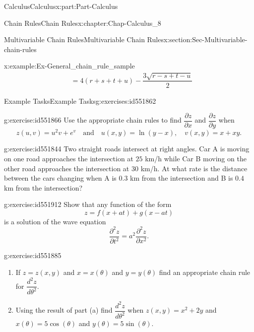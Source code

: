 \documentclass[oneside,10pt,]{book}
\numberwithin{equation}{section}
\newcommand{\amp}{&}
\begin{document}
\begin{partptx}{Calculus}{}{Calculus}{}{}{x:part:Part-Calculus}
\begin{chapterptx}{Chain Rules}{}{Chain Rules}{}{}{x:chapter:Chap-Calculus_8}
\begin{sectionptx}{Multivariable Chain Rules}{}{Multivariable Chain Rules}{}{}{x:section:Sec-Multivariable-chain-rules}
\begin{example}{}{x:example:Ex-General_chain_rule_sample}
\begin{alignat*}{1}
\amp =  4(r+s+t+u) - \dfrac{3\sqrt{r-s+t-u}}{2}
\end{alignat*}
%
\end{example}
%
%
\typeout{************************************************}
\typeout{************************************************}
%
\begin{exercises-subsection-numberless}{Example Tasks}{}{Example Tasks}{}{}{g:exercises:id551862}
\begin{divisionexercise}{1}{}{}{g:exercise:id551866}%
Use the appropriate chain rules to find \(\dfrac{\partial z}{\partial x}\) and \(\dfrac{\partial z}{\partial y}\) when%
\begin{equation*}
z(u,v)=u^2v+e^v  \quad \text{and} \quad u(x,y) = \ln(y-x), \quad v(x,y) = x+xy.
\end{equation*}
\end{divisionexercise}%
\begin{divisionexercise}{2}{}{}{g:exercise:id551844}%
Two straight roads intersect at right angles. Car A is moving on one road approaches the intersection at \(25\) km\slash{}h while Car B moving on the other road approaches the intersection at \(30\) km\slash{}h. At what rate is the distance between the cars changing when A is \(0.3\) km from the intersection and B is \(0.4\) km from the intersection?\end{divisionexercise}%
\begin{divisionexercise}{3}{}{}{g:exercise:id551912}%
Show that any function of the form%
\begin{equation*}
z = f(x+at) + g(x-at)
\end{equation*}
is a solution of the wave equation%
\begin{equation*}
\dfrac{\partial^2 z}{\partial t^2} = a^2\dfrac{\partial^2 z}{\partial x^2}.
\end{equation*}
\end{divisionexercise}%
\begin{divisionexercise}{4}{}{}{g:exercise:id551885}%
%
\begin{enumerate}[label=\alph*]
\item{}If \(z=z(x,y)\) and \(x=x(\theta)\) and \(y=y(\theta)\) find an appropriate chain rule for \(\dfrac{d^2z}{d\theta^2}\).%
\item{}Using the result of part (a) find \(\dfrac{d^2z}{d\theta^2}\) when \(z(x,y)=x^2+2y\) and \(x(\theta) = 5\cos(\theta)\) and \(y(\theta) = 5\sin(\theta)\).%
\end{enumerate}
\end{divisionexercise}%

\end{exercises-subsection-numberless}
\end{sectionptx}
\end{chapterptx}
\end{partptx}
\end{document}
